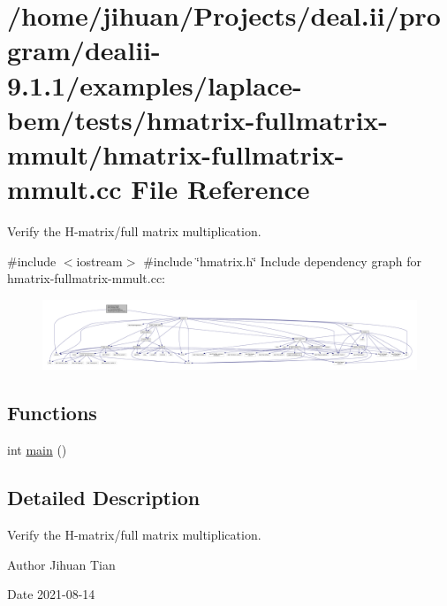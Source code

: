 \hypertarget{hmatrix-fullmatrix-mmult_8cc}{}\section{/home/jihuan/\+Projects/deal.ii/program/dealii-\/9.1.1/examples/laplace-\/bem/tests/hmatrix-\/fullmatrix-\/mmult/hmatrix-\/fullmatrix-\/mmult.cc File Reference}
\label{hmatrix-fullmatrix-mmult_8cc}


Verify the H-\/matrix/full matrix multiplication.  


{\ttfamily \#include $<$iostream$>$}\newline
{\ttfamily \#include \char`\"{}hmatrix.\+h\char`\"{}}\newline
Include dependency graph for hmatrix-\/fullmatrix-\/mmult.cc\+:\nopagebreak
\begin{figure}[H]
\begin{center}
\leavevmode
\includegraphics[width=350pt]{hmatrix-fullmatrix-mmult_8cc__incl}
\end{center}
\end{figure}
\subsection*{Functions}
\begin{DoxyCompactItemize}
\item 
int \hyperlink{hmatrix-fullmatrix-mmult_8cc_ae66f6b31b5ad750f1fe042a706a4e3d4}{main} ()
\end{DoxyCompactItemize}


\subsection{Detailed Description}
Verify the H-\/matrix/full matrix multiplication. 

\begin{DoxyAuthor}{Author}
Jihuan Tian 
\end{DoxyAuthor}
\begin{DoxyDate}{Date}
2021-\/08-\/14 
\end{DoxyDate}


